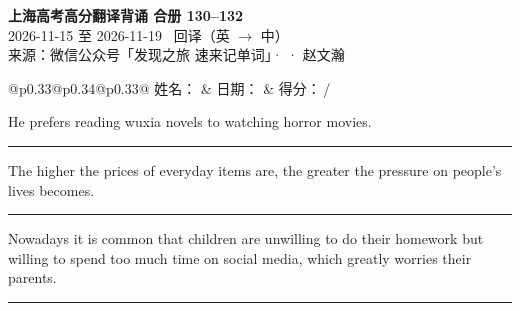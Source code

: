 \documentclass[11pt,a4paper]{article}
\newcommand{\num}[1]{\makebox[1.9em][r]{#1.}\hspace{0.3em}}
\newcommand{\wline}{\noindent\rule{\linewidth}{0.4pt}}
\begin{document}
\pagestyle{plain}
\begin{center}
{\LARGE\bfseries 上海高考高分翻译背诵 \quad 合册 130–132}\\[0.25em]
{\large 2026-11-15 至 2026-11-19 \quad\ 回译（英 $\to$ 中）}\\[0.35em]
{\footnotesize 来源：微信公众号「发现之旅 速来记单词」·  · 赵文瀚}
\end{center}

\vspace{0.4em}
\noindent\begin{tabular}{@{}p{0.33\textwidth}@{}p{0.34\textwidth}@{}p{0.33\textwidth}@{}}
姓名：\underline{\hspace{2.0cm}} & 日期：\underline{\hspace{2.0cm}} & 得分：\underline{\hspace{1.4cm}}\,/ \\
\end{tabular}

\vspace{0.5em}

\vspace{0.8em}
\vspace{0.35em}\vspace{0.15em}

\begin{minipage}{\linewidth}

\num{1}He prefers reading wuxia novels to watching horror movies.

\vspace{0.25em}

\wline

\end{minipage}

\begin{minipage}{\linewidth}

\num{2}The higher the prices of everyday items are, the greater the pressure on people’s lives becomes.

\vspace{0.25em}

\wline

\end{minipage}

\begin{minipage}{\linewidth}

\num{3}Nowadays it is common that children are unwilling to do their homework but willing to spend too much time on social media, which greatly worries their parents.

\vspace{0.25em}

\wline

\end{minipage}
\end{document}
